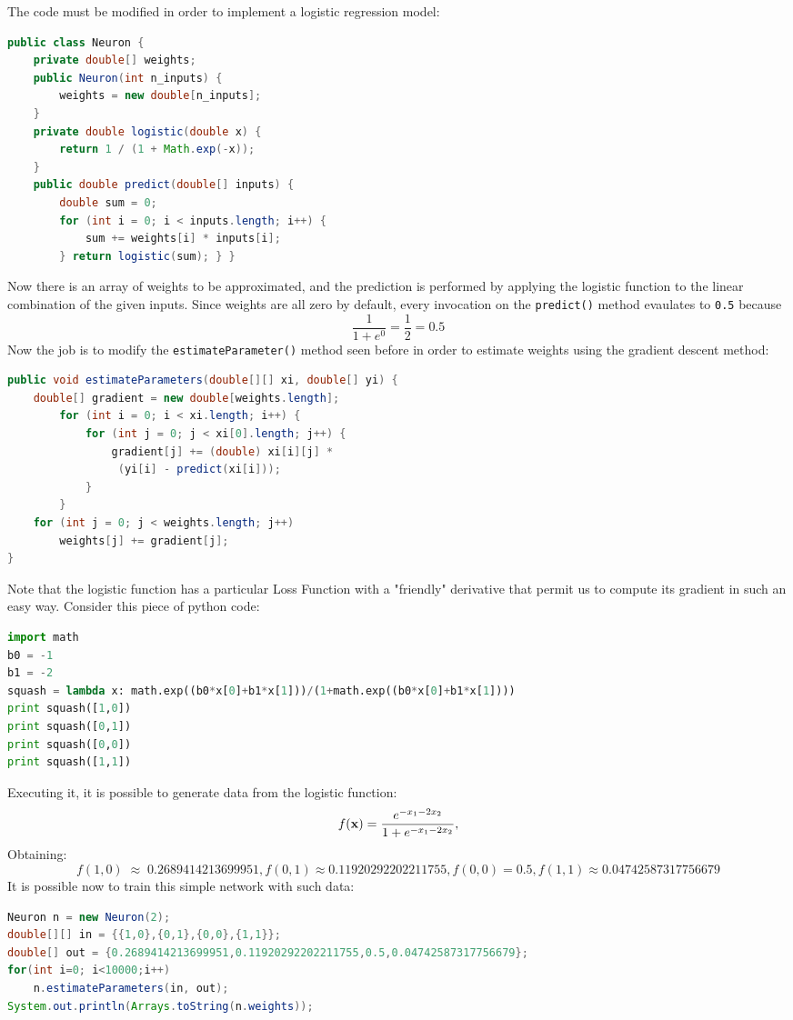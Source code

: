 \documentclass[10pt,a4paper]{article}
\begin{document}
The code must be modified in order to implement a logistic regression model:
\begin{lstlisting}[language=Java]
public class Neuron {
	private double[] weights;
	public Neuron(int n_inputs) {
		weights = new double[n_inputs];
	}
	private double logistic(double x) {
		return 1 / (1 + Math.exp(-x));
	}
	public double predict(double[] inputs) {
		double sum = 0;
		for (int i = 0; i < inputs.length; i++) {
			sum += weights[i] * inputs[i];
		} return logistic(sum); } }
\end{lstlisting}
Now there is an array of weights to be approximated, and the prediction is performed by applying the logistic function to the linear combination of the given inputs. Since weights are all zero by default, every invocation on the \texttt{predict()} method evaulates to \texttt{0.5} because
$$
\frac{1}{1+e^{0}} = \frac{1}{2} = 0.5
$$
Now the job is to modify the \texttt{estimateParameter()} method seen before in order to estimate weights using the gradient descent method:
\begin{lstlisting}[language=Java]
public void estimateParameters(double[][] xi, double[] yi) {
	double[] gradient = new double[weights.length];
		for (int i = 0; i < xi.length; i++) {
			for (int j = 0; j < xi[0].length; j++) {
				gradient[j] += (double) xi[i][j] *
				 (yi[i] - predict(xi[i]));
			}
		}
	for (int j = 0; j < weights.length; j++)
		weights[j] += gradient[j];
}
\end{lstlisting}
Note that the logistic function has a particular Loss Function with a "friendly" derivative that permit us to compute its gradient in such an easy way. 
Consider this piece of python code:
\begin{lstlisting}[language=Python]
import math
b0 = -1
b1 = -2
squash = lambda x: math.exp((b0*x[0]+b1*x[1]))/(1+math.exp((b0*x[0]+b1*x[1])))
print squash([1,0])
print squash([0,1])
print squash([0,0])
print squash([1,1])
\end{lstlisting}
Executing it, it is possible to generate data from the logistic function:
$$
f(\textbf x) = \frac{e^{-x_1-2x_2}}{1+e^{-x_1-2x_2}},
$$
Obtaining:
$$
f(1,0) \;\approx\;0.2689414213699951, f(0,1) \approx 0.11920292202211755, f(0,0) = 0.5, f(1,1) \approx 0.04742587317756679
$$
It is possible now to train this simple network with such data:
\begin{lstlisting}[language=Java]
Neuron n = new Neuron(2);
double[][] in = {{1,0},{0,1},{0,0},{1,1}};
double[] out = {0.2689414213699951,0.11920292202211755,0.5,0.04742587317756679};
for(int i=0; i<10000;i++)
	n.estimateParameters(in, out);
System.out.println(Arrays.toString(n.weights));
\end{lstlisting}
\end{document}
